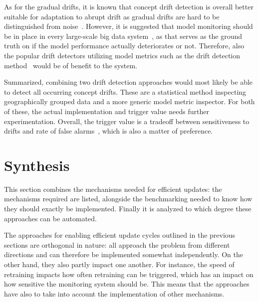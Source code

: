 As for the gradual drifts, it is known that concept drift detection is overall better suitable for adaptation to abrupt drift as gradual drifts are hard to be distinguished from noise~\cite{zliobaiteAdaptiveTrainingSet2010}. However, it is suggested that model monitoring should be in place in every large-scale big data system~\cite{googlemlops}, as that serves as the ground truth on if the model performance actually deteriorates or not. Therefore, also the popular drift detectors utilizing model metrics such as the drift detection method~\cite{gamaLearningDriftDetection2004} would be of benefit to the system.

Summarized, combining two drift detection approaches would most likely be able to detect all occurring concept drifts. These are a statistical method inspecting geographically grouped data and a more generic model metric inspector. For both of these, the actual implementation and trigger value needs further experimentation. Overall, the trigger value is a tradeoff between sensitiveness to drifts and rate of false alarms~\cite{faithfullUnsupervisedChangeDetection2018}, which is also a matter of preference.

\section{Synthesis}

This section combines the mechanisms needed for efficient updates: the mechanisms required are listed, alongside the benchmarking needed to know how they should exactly be implemented. Finally it is analyzed to which degree these approaches can be automated.


The approaches for enabling efficient update cycles outlined in the previous sections are orthogonal in nature: all approach the problem from different directions and can therefore be implemented somewhat independently. On the other hand, they also partly impact one another. For instance, the speed of retraining impacts how often retraining can be triggered, which has an impact on how sensitive the monitoring system should be. This means that the approaches have also to take into account the implementation of other mechanisms.

